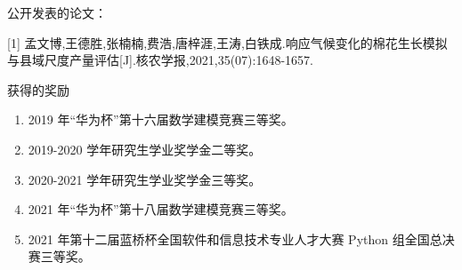 \documentclass[a4paper,oneside,zihao=-4,AutoFakeBold,fontset=windows]{ctexbook}
\begin{document}
\begin{spacing}{}
  公开发表的论文：

  [1] 孟文博,王德胜,张楠楠,费浩,唐梓涯,王涛,白铁成.响应气候变化的棉花生长模拟与县域尺度产量评估[J].核农学报,2021,35(07):1648-1657.

  获得的奖励
  \begin{enumerate}
    \item 2019 年“华为杯”第十六届数学建模竞赛三等奖。
    \item 2019{-}2020 学年研究生学业奖学金二等奖。
    \item 2020{-}2021 学年研究生学业奖学金三等奖。
    \item 2021 年“华为杯”第十八届数学建模竞赛三等奖。
    \item 2021 年第十二届蓝桥杯全国软件和信息技术专业人才大赛 Python 组全国总决赛三等奖。
  \end{enumerate}
\end{spacing}
\end{document}
